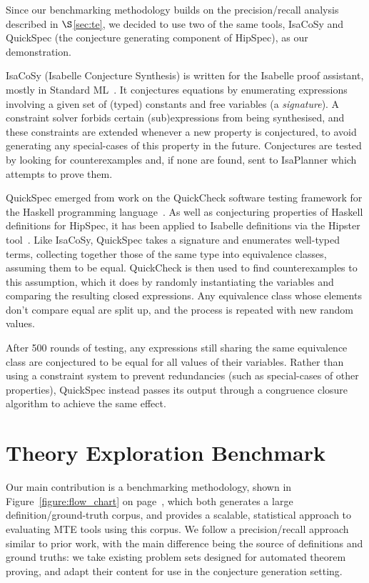 Since our benchmarking methodology builds on the precision/recall analysis
described in $\S$\ref{sec:te}, we decided to use two of the same tools, IsaCoSy
and QuickSpec (the conjecture generating component of HipSpec), as our
demonstration.

IsaCoSy (Isabelle Conjecture Synthesis) is written for the Isabelle proof
assistant, mostly in Standard
ML~\cite{Johansson.Dixon.Bundy:conjecture-generation}. It conjectures equations
by enumerating expressions involving a given set of (typed) constants and free
variables (a \emph{signature}). A constraint solver forbids certain
(sub)expressions from being synthesised, and these constraints are extended
whenever a new property is conjectured, to avoid generating any special-cases of
this property in the future. Conjectures are tested by looking for
counterexamples and, if none are found, sent to IsaPlanner which attempts to
prove them.

QuickSpec emerged from work on the QuickCheck software testing framework for the
Haskell programming language~\cite{claessen2011quickcheck}. As well as
conjecturing properties of Haskell definitions for HipSpec, it has been applied
to Isabelle definitions via the Hipster tool~\cite{Hipster}. Like IsaCoSy,
QuickSpec takes a signature and enumerates well-typed terms, collecting together
those of the same type into equivalence classes, assuming them to be
equal. QuickCheck is then used to find counterexamples to this assumption, which
it does by randomly instantiating the variables and comparing the resulting
closed expressions. Any equivalence class whose elements don't compare equal are
split up, and the process is repeated with new random values.

After 500 rounds of testing, any expressions still sharing the same equivalence
class are conjectured to be equal for all values of their variables. Rather than
using a constraint system to prevent redundancies (such as special-cases of
other properties), QuickSpec instead passes its output through a congruence
closure algorithm to achieve the same effect.

\section{Theory Exploration Benchmark}
\label{sec:proposal}

Our main contribution is a benchmarking methodology, shown in
Figure~\ref{figure:flow_chart} on page~\pageref{figure:flow_chart}, which both
generates a large definition/ground-truth corpus, and provides a scalable,
statistical approach to evaluating MTE tools using this corpus. We follow a
precision/recall approach similar to prior work, with the main difference being
the source of definitions and ground truths: we take existing problem sets
designed for automated theorem proving, and adapt their content for use in the
conjecture generation setting.

